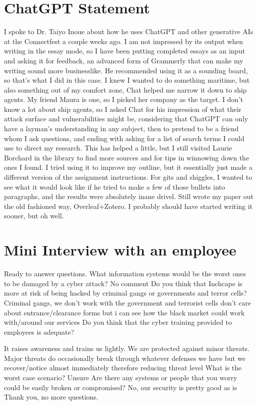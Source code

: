 \documentclass[12pt]{article}
\begin{document}
\section*{ChatGPT Statement}
I spoke to Dr. Taiyo Inoue about how he uses ChatGPT and other generative AIs at the Connectfest a couple weeks ago. I am not impressed by its output when writing in the essay mode, so I have been putting completed essays as an input and asking it for feedback, an advanced form of Grammerly that can make my writing sound more businesslike. He recommended using it as a sounding board, so that's what I did in this case. I knew I wanted to do something maritime, but also something out of my comfort zone, Chat helped me narrow it down to ship agents. My friend Maura is one, so I picked her company as the target. I don't know a lot about ship agents, so I asked Chat for his impression of what their attack surface and vulnerabilities might be, considering that ChatGPT can only have a layman's understanding in any subject, then to pretend to be a friend whom I ask questions, and ending with asking for a list of search terms I could use to direct my research. This has helped a little, but I still visited Laurie Borchard in the library to find more sources and for tips in winnowing down the ones I found. I tried using it to improve my outline, but it essentially just made a different version of the assignment instructions. For gits and shiggles, I wanted to see what it would look like if he tried to make a few of those bullets into paragraphs, and the results were absolutely inane drivel. Still wrote my paper out the old fashioned way, Overleaf+Zotero. I probably should have started writing it sooner, but oh well.
\section*{Mini Interview with an employee}
\begin{newchat}
Ready to answer questions.
What information systems would be the worst ones to be damaged by a cyber attack? 
No comment 
Do you think that Inchcape is more at risk of being hacked by criminal gangs or governments and terror cells? 
Criminal gangs, we don't work with the government and terrorist cells don't care about entrance/clearance forms but i can see how the black market could work with/around our services
Do you think that the cyber training provided to employees is adequate? 
\end{newchat}
\begin{newchat}
It raises awareness and trains us lightly. We are protected against minor threats. Major threats do occasionally break through whatever defenses we have but we recover/notice almost immediately therefore reducing threat level
What is the worst case scenario? 
Unsure
Are there any systems or people that you worry could be easily broken or compromised?
No, our security is pretty good as is
Thank you, no more questions.
\end{newchat}
\end{document}
